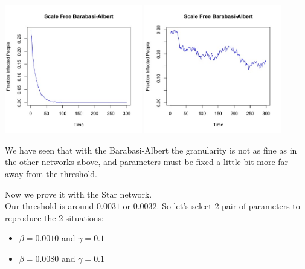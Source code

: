 \documentclass{article}
\begin{document}
\begin{center}
   
    
    \includegraphics[width=6cm]{barabasi_albert_small.jpeg}
    \includegraphics[width=6cm]{barabasi_albert_big.jpeg}
    
    
\end{center}

\noindent We have seen that with the Barabasi-Albert the granularity is not as fine as in the other networks above, and parameters must be fixed a little bit more far away from the threshold.

\newpage

\noindent Now we prove it with the Star network.\\

\noindent Our threshold is around $0.0031$ or $0.0032$. So let's select 2 pair of parameters to reproduce the 2 situations:\\

\begin{itemize}
  \item $\beta = 0.0010$ and $\gamma = 0.1$
  \item $\beta = 0.0080$ and $\gamma = 0.1$\\
\end{itemize}
\end{document}
